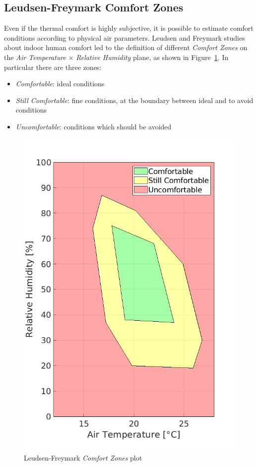 \documentclass[peerreview]{IEEEtran}
\begin{document}
\subsection{Leudsen-Freymark Comfort Zones}
Even if the thermal comfort is highly subjective, it is possible to estimate
comfort conditions according to physical air parameters.
Leudsen and Freymark studies about indoor human comfort led to the definition of
different \emph{Comfort Zones} on the \emph{Air Temperature} $\times$
\emph{Relative Humidity} plane, as shown in Figure~\ref{fig:lf_plot}.
In particular there are three zones:
\begin{itemize}
	\item \emph{Comfortable}: ideal conditions
	\item \emph{Still Comfortable}: fine conditions, at the boundary between
		ideal and to avoid conditions
	\item \emph{Uncomfortable}: conditions which should be avoided
\end{itemize}

\begin{figure}[!htbp]
	\centering
	\includegraphics[width=0.7\columnwidth]{leudsen_freymark_plot} 
	\caption{Leudsen-Freymark \emph{Comfort Zones} plot}
	\label{fig:lf_plot}
\end{figure}
\end{document}
